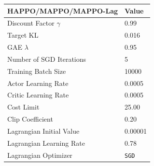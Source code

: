 \documentclass{article}
\begin{document}
\begin{table}[ht]
{\begin{subtable}{.5\textwidth}
  \centering
  \begin{tabular}{ll}
    \toprule
    \textbf{HAPPO/MAPPO/MAPPO-Lag} & \textbf{Value} \\
    \midrule
    Discount Factor $\gamma$ & 0.99 \\
    Target KL & 0.016 \\
    GAE $\lambda$ & 0.95 \\
    Number of SGD Iterations & 5 \\
    Training Batch Size & 10000 \\
    Actor Learning Rate & 0.0005 \\
    Critic Learning Rate & 0.0005 \\
    Cost Limit & 25.00 \\
    Clip Coefficient & 0.20\\
    Lagrangian Initial Value & 0.00001 \\
    Lagrangian Learning Rate & 0.78 \\
    Lagrangian Optimizer & \texttt{SGD} \\
    \bottomrule
  \end{tabular}
\end{subtable}\hfill 
} 

\smallskip


\end{table}
\end{document}
